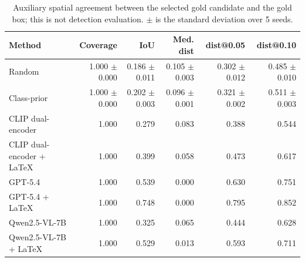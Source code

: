 \begin{table}[t]
\centering
\caption{Auxiliary spatial agreement between the selected gold candidate and the gold box; this is not detection evaluation. $\pm$ is the standard deviation over 5 seeds.}
\label{tab:spatial}
\begin{tabular}{lrrrrr}
\toprule
Method & Coverage & IoU & Med. dist & dist@0.05 & dist@0.10 \\
\midrule
Random & 1.000 $\pm$ 0.000 & 0.186 $\pm$ 0.011 & 0.105 $\pm$ 0.003 & 0.302 $\pm$ 0.012 & 0.485 $\pm$ 0.010 \\
Class-prior & 1.000 $\pm$ 0.000 & 0.202 $\pm$ 0.003 & 0.096 $\pm$ 0.001 & 0.321 $\pm$ 0.002 & 0.511 $\pm$ 0.003 \\
CLIP dual-encoder & 1.000 & 0.279 & 0.083 & 0.388 & 0.544 \\
CLIP dual-encoder + LaTeX & 1.000 & 0.399 & 0.058 & 0.473 & 0.617 \\
GPT-5.4 & 1.000 & 0.539 & 0.000 & 0.630 & 0.751 \\
GPT-5.4 + LaTeX & 1.000 & 0.748 & 0.000 & 0.795 & 0.852 \\
Qwen2.5-VL-7B & 1.000 & 0.325 & 0.065 & 0.444 & 0.628 \\
Qwen2.5-VL-7B + LaTeX & 1.000 & 0.529 & 0.013 & 0.593 & 0.711 \\
\bottomrule
\end{tabular}
\end{table}
